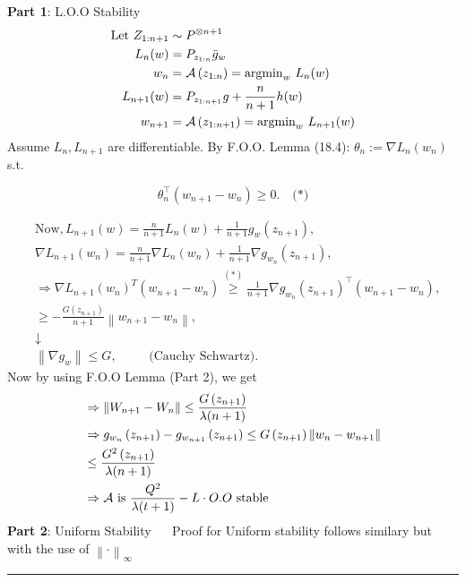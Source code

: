 \documentclass[twoside]{article}
\newenvironment{proof}{{\bf Proof:}}{\hfill\rule{2mm}{2mm}}
\begin{document}
\begin{proof}

\\~\\ \textbf{Part 1}: L.O.O Stability \\

$$
\begin{aligned}
\text{Let } Z_{1:n+1} &\sim P^{\otimes n+1} \\
L_n(w) &= P_{z_{1: n}} \bar{g}_{w} \\
w_{n} &= \mathcal{A} \left(z_{1: n}\right) = \operatorname{argmin}_{w} \, L_n(w)  \\
L_{n+1}(w) &= P_{z_{1: n+1}} g + \frac{n}{n+1} h(w) \\
w_{n+1} &= \mathcal{A} \left(z_{1: n+1}\right) = \operatorname{argmin}_{w} \, L_{n+1}(w)
\end{aligned}
$$
Assume $L_{n}, L_{n+1}$ are differentiable. By F.O.O. Lemma (18.4): $\theta_{n}:=\nabla L_{n}\left(w_{n}\right)$ s.t.

$$
\theta_{n}^{\top}\left(w_{n+1}-w_{n}\right) \geqslant 0 . \quad \text{(*)}
$$

$$
\begin{aligned}
& \text{Now,} \, L_{n+1}(w) = \frac{n}{n+1} L_{n}(w) + \frac{1}{n+1} g_{w}\left(z_{n+1}\right), \\
& \nabla L_{n+1}\left(w_{n}\right) = \frac{n}{n+1} \nabla L_{n}\left(w_{n}\right) + \frac{1}{n+1} \nabla g_{w_{n}}\left(z_{n+1}\right), \\
& \Rightarrow \nabla L_{n+1}\left(w_{n}\right)^{T}\left(w_{n+1} - w_{n}\right) \stackrel{(*)}{\geqslant} \frac{1}{n+1} \nabla g_{w_{n}}\left(z_{n+1}\right)^{\top}\left(w_{n+1} - w_{n}\right), \\
& \geqslant -\frac{G\left(z_{n+1}\right)}{n+1}\left\|w_{n+1} - w_{n}\right\|, \\
& \downarrow \\
& \left\|\nabla g_{w}\right\| \leqslant G, \, \hspace{1cm}\text{(Cauchy Schwartz)}.
\end{aligned}
$$
Now by using F.O.O Lemma (Part 2), we get
$$
\begin{aligned}
& \Rightarrow\left\|W_{n+1}-W_{n}\right\| \leq \frac{G\left(z_{n+1}\right)}{\lambda(n+1)} \\
& \Rightarrow g_{w_{n}}\left(z_{n+1}\right)-g_{w_{n+1}}\left(z_{n+1}\right) \leq G\left(z_{n+1}\right)\left\|w_{n}-w_{n+1}\right\| \\
& \leq \frac{G^{2}\left(z_{n+1}\right)}{\lambda(n+1)} \\
& \Rightarrow \mathcal{A} \text { is } \frac{Q^{2}}{\lambda(t+1)}-L \cdot O.O \text { stable }
\end{aligned}
$$
\textbf{Part 2}: Uniform Stability $\quad$ Proof for Uniform stability follows similary but with the use of $\left\|\cdot \right\|_\infty$ \\



\end{proof}
\end{document}
